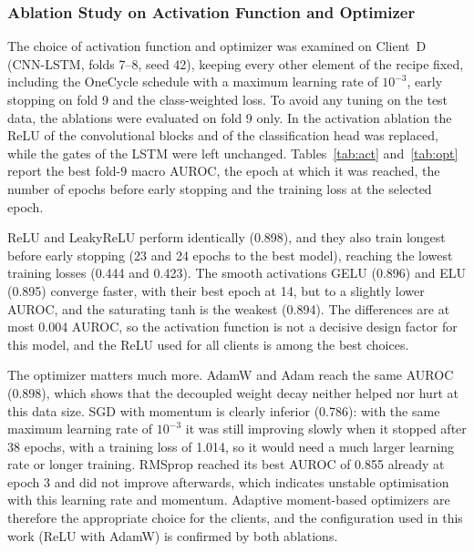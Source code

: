 \subsubsection{Ablation Study on Activation Function and Optimizer}
The choice of activation function and optimizer was examined on Client~D (CNN-LSTM, folds 7--8, seed
42), keeping every other element of the recipe fixed, including the OneCycle schedule with a maximum
learning rate of $10^{-3}$, early stopping on fold 9 and the class-weighted loss. To avoid any tuning
on the test data, the ablations were evaluated on fold 9 only. In the activation ablation the ReLU of
the convolutional blocks and of the classification head was replaced, while the gates of the LSTM were
left unchanged. Tables~\ref{tab:act} and~\ref{tab:opt} report the best fold-9 macro AUROC, the epoch at
which it was reached, the number of epochs before early stopping and the training loss at the selected
epoch.

\begin{table}[!t]
\centering
\caption{Activation-function ablation (Client D, CNN-LSTM, seed 42; fold-9 macro AUROC)}
\label{tab:act}
\footnotesize
\resizebox{\columnwidth}{!}{}
\end{table}

\begin{table}[!t]
\centering
\caption{Optimizer ablation (Client D, CNN-LSTM, seed 42; fold-9 macro AUROC; maximum learning rate
$10^{-3}$ for all optimizers)}
\label{tab:opt}
\footnotesize
\resizebox{\columnwidth}{!}{}
\end{table}

ReLU and LeakyReLU perform identically (0.898), and they also train longest before early stopping (23
and 24 epochs to the best model), reaching the lowest training losses (0.444 and 0.423). The smooth
activations GELU (0.896) and ELU (0.895) converge faster, with their best epoch at 14, but to a
slightly lower AUROC, and the saturating tanh is the weakest (0.894). The differences are at most 0.004
AUROC, so the activation function is not a decisive design factor for this model, and the ReLU used for
all clients is among the best choices.

The optimizer matters much more. AdamW and Adam reach the same AUROC (0.898), which shows that the
decoupled weight decay neither helped nor hurt at this data size. SGD with momentum is clearly
inferior (0.786): with the same maximum learning rate of $10^{-3}$ it was still improving slowly when
it stopped after 38 epochs, with a training loss of 1.014, so it would need a much larger learning rate
or longer training. RMSprop reached its best AUROC of 0.855 already at epoch 3 and did not improve
afterwards, which indicates unstable optimisation with this learning rate and momentum. Adaptive
moment-based optimizers are therefore the appropriate choice for the clients, and the configuration
used in this work (ReLU with AdamW) is confirmed by both ablations.

